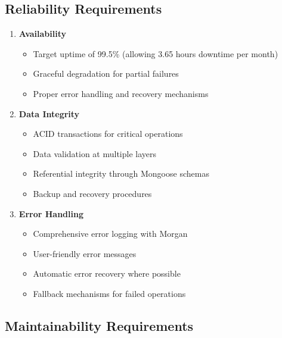 \subsection{Reliability Requirements}

\begin{enumerate}[leftmargin=*]
    \item \textbf{Availability}
    \begin{itemize}
        \item Target uptime of 99.5\% (allowing 3.65 hours downtime per month)
        \item Graceful degradation for partial failures
        \item Proper error handling and recovery mechanisms
    \end{itemize}
    
    \item \textbf{Data Integrity}
    \begin{itemize}
        \item ACID transactions for critical operations
        \item Data validation at multiple layers
        \item Referential integrity through Mongoose schemas
        \item Backup and recovery procedures
    \end{itemize}
    
    \item \textbf{Error Handling}
    \begin{itemize}
        \item Comprehensive error logging with Morgan
        \item User-friendly error messages
        \item Automatic error recovery where possible
        \item Fallback mechanisms for failed operations
    \end{itemize}
\end{enumerate}

\subsection{Maintainability Requirements}

